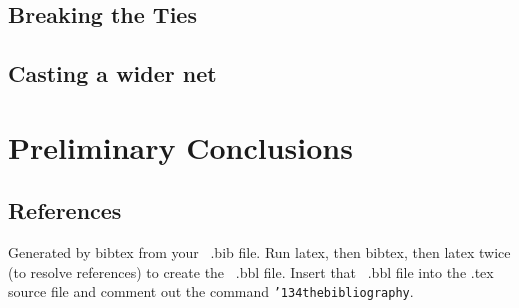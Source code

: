 \documentclass{acm_proc_article-sp}
\begin{document}


\subsection{Breaking the Ties}





\subsection{Casting a wider net}



\section{Preliminary Conclusions}





\subsection{References}
Generated by bibtex from your ~.bib file.  Run latex,
then bibtex, then latex twice (to resolve references)
to create the ~.bbl file.  Insert that ~.bbl file into
the .tex source file and comment out
the command \texttt{{\char'134}thebibliography}.
\balancecolumns
\end{document}
